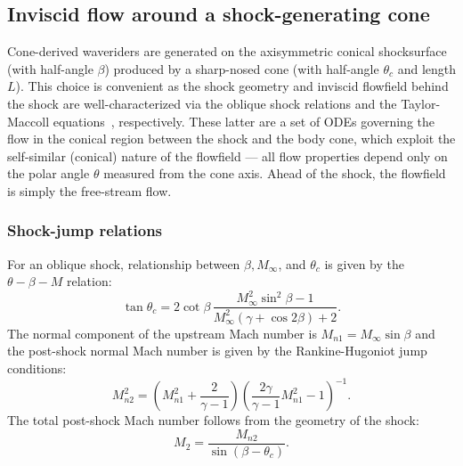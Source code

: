 \documentclass[10pt,a4paper]{article}
\begin{document}
\subsection{Inviscid flow around a shock-generating cone}
Cone-derived waveriders are generated on the axisymmetric conical shocksurface (with half-angle $\beta$) produced by a sharp-nosed cone (with half-angle $\theta_c$ and length $L$). This choice is convenient as the shock geometry and inviscid flowfield behind the shock are well-characterized via the oblique shock relations and the Taylor-Maccoll equations~\cite{Maccoll:1937}, respectively. These latter are a set of ODEs governing the flow in the conical region between the shock and the body cone, which exploit the self-similar (conical) nature of the flowfield --- all flow properties depend only on the polar angle $\theta$ measured from the cone axis. Ahead of the shock, the flowfield is simply the free-stream flow.

\subsubsection{Shock-jump relations}
For an oblique shock, relationship between $\beta,M_\infty$, and $\theta_c$ is given by the $\theta-\beta-M$ relation:
\begin{equation}
    \tan\theta_c = 2\cot\beta \,
    \frac{M_\infty^2 \sin^2\!\beta - 1}{M_\infty^2\!\left(\gamma + \cos 2\beta\right) + 2}.
    \label{eq:theta_beta_M}
\end{equation}
The normal component of the upstream Mach number is $M_{n1}=M_\infty\sin\beta$ and the post-shock normal Mach number is given by the Rankine-Hugoniot jump conditions:
\begin{equation}
    M_{n2}^2 = \left(M_{n1}^2 + \dfrac{2}{\gamma-1}\right){\left(\dfrac{2\gamma}{\gamma-1}M_{n1}^2 - 1\right)}^{-1}.
    \label{eq:Mn2}
\end{equation}
The total post-shock Mach number follows from the geometry of the shock:
\begin{equation}
    M_2 = \frac{M_{n2}}{\sin(\beta - \theta_c)}.
    \label{eq:M2}
\end{equation}
\end{document}

